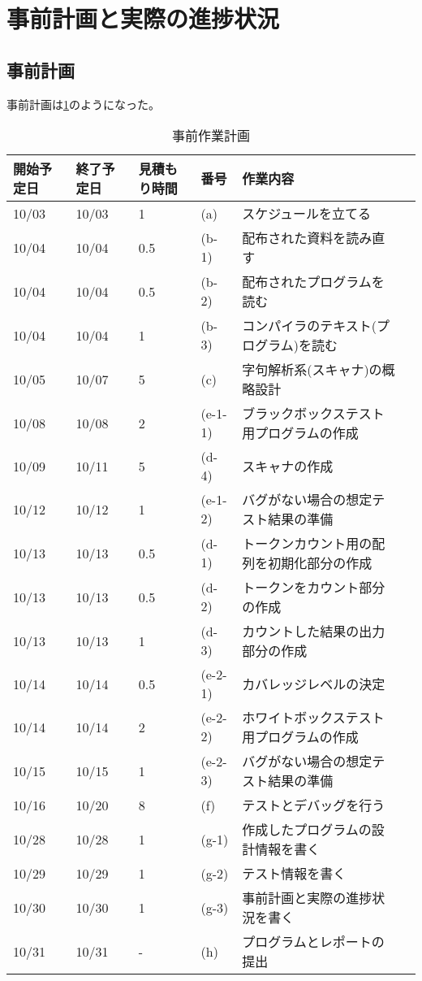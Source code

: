 \documentclass[a4j]{jsarticle}
\begin{document}
\section{事前計画と実際の進捗状況}
  \subsection{事前計画}
  事前計画は\ref{tab:schedule}のようになった。
  \begin{table}[H]
    \centering
    \caption{事前作業計画}
    \label{tab:schedule}
    \begin{tabular}{|l|l|l|l|l|l|}
      \hline
      開始予定日&終了予定日&見積もり時間&番号&作業内容\\ \hline
      10/03 & 10/03 & 1 & (a) & スケジュールを立てる \\ \hline
      10/04 & 10/04 & 0.5 & (b-1) & 配布された資料を読み直す \\ \hline
      10/04 & 10/04 & 0.5 & (b-2) & 配布されたプログラムを読む \\ \hline
      10/04 & 10/04 & 1 & (b-3) & コンパイラのテキスト(プログラム)を読む \\ \hline
      10/05 & 10/07 & 5 & (c) & 字句解析系(スキャナ)の概略設計 \\ \hline
      10/08 & 10/08 & 2 & (e-1-1) & ブラックボックステスト用プログラムの作成 \\ \hline
      10/09 & 10/11 & 5 & (d-4) & スキャナの作成 \\ \hline
      10/12 & 10/12 & 1 & (e-1-2) & バグがない場合の想定テスト結果の準備 \\ \hline
      10/13 & 10/13 & 0.5 & (d-1) & トークンカウント用の配列を初期化部分の作成 \\ \hline
      10/13 & 10/13 & 0.5 & (d-2) & トークンをカウント部分の作成 \\ \hline
      10/13 & 10/13 & 1 & (d-3) & カウントした結果の出力部分の作成 \\ \hline
      10/14 & 10/14 & 0.5 & (e-2-1) & カバレッジレベルの決定 \\ \hline
      10/14 & 10/14 & 2 & (e-2-2) & ホワイトボックステスト用プログラムの作成 \\ \hline
      10/15 & 10/15 & 1 & (e-2-3) & バグがない場合の想定テスト結果の準備 \\ \hline
      10/16 & 10/20 & 8 & (f) & テストとデバッグを行う \\ \hline
      10/28 & 10/28 & 1 & (g-1) & 作成したプログラムの設計情報を書く \\ \hline
      10/29 & 10/29 & 1 & (g-2) & テスト情報を書く \\ \hline
      10/30 & 10/30 & 1 & (g-3) & 事前計画と実際の進捗状況を書く \\ \hline
      10/31 & 10/31 & - & (h) & プログラムとレポートの提出 \\ \hline
    \end{tabular}
  \end{table}
\end{document}
